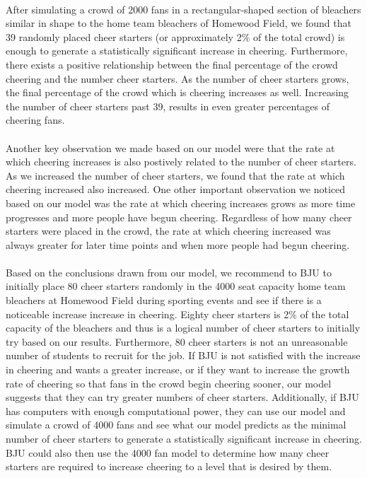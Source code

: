 \documentclass[oneside,12pt]{report}
\begin{document}
\paragraph{}
After simulating a crowd of 2000 fans in a rectangular-shaped section of bleachers similar in shape to the home team bleachers of Homewood Field, we found that 39 randomly placed cheer starters (or approximately 2\% of the total crowd) is enough to generate a statistically significant increase in cheering. Furthermore, there exists a positive relationship between the final percentage of the crowd cheering and the number cheer starters. As the number of cheer starters grows, the final percentage of the crowd which is cheering increases as well. Increasing the number of cheer starters past 39, results in even greater percentages of cheering fans.
\paragraph{}
Another key observation we made based on our model were that the rate at which cheering increases is also postively related to the number of cheer starters. As we increased the number of cheer starters, we found that the rate at which cheering increased also increased. One other important observation we noticed based on our model was the rate at which cheering increases grows as more time progresses and more people have begun cheering. Regardless of how many cheer starters were placed in the crowd, the rate at which cheering increased was always greater for later time points and when more people had begun cheering.
\paragraph{}
Based on the conclusions drawn from our model, we recommend to BJU to initially place 80 cheer starters randomly in the 4000 seat capacity home team bleachers at Homewood Field during sporting events and see if there is a noticeable increase increase in cheering. Eighty cheer starters is 2\% of the total capacity of the bleachers and thus is a logical number of cheer starters to initially try based on our results. Furthermore, 80 cheer starters is not an unreasonable number of students to recruit for the job. If BJU is not satisfied with the increase in cheering and wants a greater increase, or if they want to increase the growth rate of cheering so that fans in the crowd begin cheering sooner, our model suggests that they can try greater numbers of cheer starters. Additionally, if BJU has computers with enough computational power, they can use our model and simulate a crowd of 4000 fans and see what our model predicts as the minimal number of cheer starters to generate a statistically significant increase in cheering. BJU could also then use the 4000 fan model to determine how many cheer starters are required to increase cheering to a level that is desired by them. 
\end{document}
